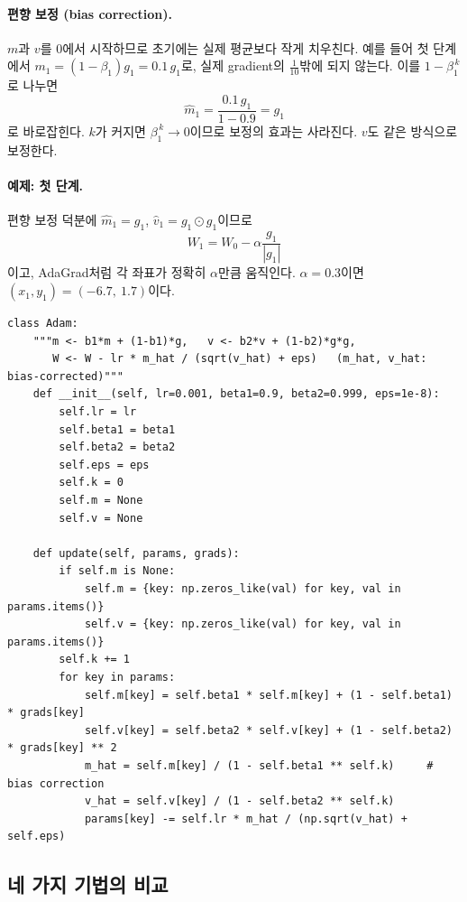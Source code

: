 \documentclass[11pt,a4paper]{article}
\begin{document}
\paragraph{편향 보정 (bias correction).}
$m$과 $v$를 $0$에서 시작하므로 초기에는 실제 평균보다 작게 치우친다.
예를 들어 첫 단계에서 $m_1=(1-\beta_1)g_1=0.1\,g_1$로, 실제 gradient의 $\frac{1}{10}$밖에 되지 않는다.
이를 $1-\beta_1^{\,k}$로 나누면
\[
\hat m_1=\frac{0.1\,g_1}{1-0.9}=g_1
\]
로 바로잡힌다. $k$가 커지면 $\beta_1^{\,k}\to0$이므로 보정의 효과는 사라진다.
$v$도 같은 방식으로 보정한다.

\paragraph{예제: 첫 단계.}
편향 보정 덕분에 $\hat m_1=g_1$, $\hat v_1=g_1\odot g_1$이므로
\[
W_1=W_0-\alpha\frac{g_1}{|g_1|}
\]
이고, AdaGrad처럼 각 좌표가 정확히 $\alpha$만큼 움직인다.
$\alpha=0.3$이면 $(x_1,y_1)=(-6.7,\ 1.7)$이다.

\begin{lstlisting}
class Adam:
    """m <- b1*m + (1-b1)*g,   v <- b2*v + (1-b2)*g*g,
       W <- W - lr * m_hat / (sqrt(v_hat) + eps)   (m_hat, v_hat: bias-corrected)"""
    def __init__(self, lr=0.001, beta1=0.9, beta2=0.999, eps=1e-8):
        self.lr = lr
        self.beta1 = beta1
        self.beta2 = beta2
        self.eps = eps
        self.k = 0
        self.m = None
        self.v = None

    def update(self, params, grads):
        if self.m is None:
            self.m = {key: np.zeros_like(val) for key, val in params.items()}
            self.v = {key: np.zeros_like(val) for key, val in params.items()}
        self.k += 1
        for key in params:
            self.m[key] = self.beta1 * self.m[key] + (1 - self.beta1) * grads[key]
            self.v[key] = self.beta2 * self.v[key] + (1 - self.beta2) * grads[key] ** 2
            m_hat = self.m[key] / (1 - self.beta1 ** self.k)     # bias correction
            v_hat = self.v[key] / (1 - self.beta2 ** self.k)
            params[key] -= self.lr * m_hat / (np.sqrt(v_hat) + self.eps)
\end{lstlisting}

\subsection{네 가지 기법의 비교}\label{sec:compare}
\end{document}
